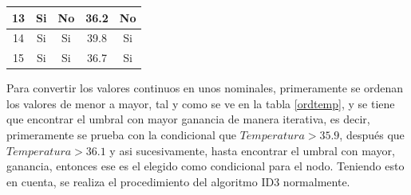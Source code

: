 \documentclass[twoside,spanish,ESP,MSc]{plantillaLabUPV}
\theoremstyle{definition}
\begin{document}
\begin{table}[h]
\begin{tabular}{|c|c|c|c|c|}
		13          & Si           & No                                                                     & 36.2              & No             \\ \hline
		14          & Si           & Si                                                                     & 39.8              & Si             \\ \hline
		15          & Si           & Si                                                                     & 36.7              & Si             \\ \hline
	\end{tabular}
\end{table}

Para convertir los valores continuos en unos nominales, primeramente se ordenan los valores de menor a mayor, tal y como se ve en la tabla \ref{ordtemp}, y se tiene que encontrar el umbral con mayor ganancia de manera iterativa, es decir, primeramente se prueba con la condicional que $Temperatura > 35.9$, después que $Temperatura > 36.1$ y asi sucesivamente, hasta encontrar el umbral con mayor, ganancia, entonces ese es el elegido como condicional para el nodo. Teniendo esto en cuenta, se realiza el procedimiento del algoritmo ID3 normalmente.
\end{document}
